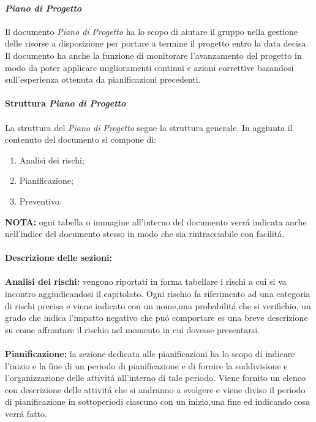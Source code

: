 \paragraph{\textit{Piano di Progetto}}

Il documento \textit{\textit{Piano di Progetto}} ha lo scopo di aiutare il gruppo nella gestione delle risorse a disposizione per portare a termine il progetto entro la data decisa.
Il documento ha anche la funzione di monitorare l'avanzamento del progetto in modo da poter applicare miglioramenti continui e azioni correttive
basandosi sull'esperienza ottenuta da pianificazioni precedenti.
\\\\
\textbf{Struttura \textit{\textit{Piano di Progetto}}}
\\\\
La struttura del \textit{\textit{Piano di Progetto}} segue la struttura generale.
In aggiunta il contenuto del documento si compone di:
\begin{enumerate}
    \item Analisi dei rischi;
    \item Pianificazione;
    \item Preventivo.
\end{enumerate}
\textbf{NOTA:} ogni tabella o immagine all'interno del documento verrá indicata anche nell'indice del documento stesso in modo che sia rintracciabile con 
facilitá.
\\\\
\textbf{Descrizione delle sezioni:}
\\\\
\textbf{Analisi dei rischi:} vengono riportati in forma tabellare i rischi a cui si va incontro aggiudicandosi il capitolato.
Ogni rischio fa riferimento ad una categoria di rischi precisa e viene indicato con un nome,una probabilitá che si verifichio,
un grado che indica l'impatto negativo che puó
comportare es una breve descrizione su come affrontare il rischio nel momento in cui dovesse presentarsi.
\\\\
\textbf{Pianificazione:} la sezione dedicata alle pianificazioni ha lo scopo di indicare l'inizio e la fine di un periodo di pianificazione e 
di fornire la suddivisione e l'organizzazione delle attivitá all'interno di tale periodo.
Viene fornito un elenco con descrizione delle attivitá che si andranno a svolgere e viene diviso il periodo di pianificazione in sottoperiodi 
ciascuno con un inizio,una fine ed indicando cosa verrá fatto.
